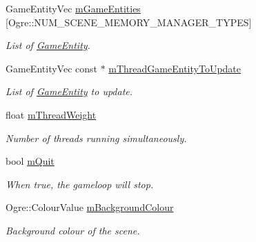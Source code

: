\begin{DoxyCompactItemize}
\mbox{\label{class_common_1_1_graphics_system_a39c347647fabbfb8d86a8e7fc55825bd}} 
Game\+Entity\+Vec \hyperlink{class_common_1_1_graphics_system_a39c347647fabbfb8d86a8e7fc55825bd}{m\+Game\+Entities} \mbox{[}Ogre\+::\+N\+U\+M\+\_\+\+S\+C\+E\+N\+E\+\_\+\+M\+E\+M\+O\+R\+Y\+\_\+\+M\+A\+N\+A\+G\+E\+R\+\_\+\+T\+Y\+P\+ES\mbox{]}
\begin{DoxyCompactList}\small\item\em List of \hyperlink{struct_common_1_1_game_entity}{Game\+Entity}. \end{DoxyCompactList}\item 
\mbox{\label{class_common_1_1_graphics_system_adaf0d898cd16130084bdf36220f6111b}} 
Game\+Entity\+Vec const  $\ast$ \hyperlink{class_common_1_1_graphics_system_adaf0d898cd16130084bdf36220f6111b}{m\+Thread\+Game\+Entity\+To\+Update}
\begin{DoxyCompactList}\small\item\em List of \hyperlink{struct_common_1_1_game_entity}{Game\+Entity} to update. \end{DoxyCompactList}\item 
\mbox{\label{class_common_1_1_graphics_system_a41e916be28a4d889337a4c8c0868b3ed}} 
float \hyperlink{class_common_1_1_graphics_system_a41e916be28a4d889337a4c8c0868b3ed}{m\+Thread\+Weight}
\begin{DoxyCompactList}\small\item\em Number of threads running simultaneously. \end{DoxyCompactList}\item 
\mbox{\label{class_common_1_1_graphics_system_a141239a20891b1a980e319a89420f2b0}} 
bool \hyperlink{class_common_1_1_graphics_system_a141239a20891b1a980e319a89420f2b0}{m\+Quit}
\begin{DoxyCompactList}\small\item\em When true, the gameloop will stop. \end{DoxyCompactList}\item 
\mbox{\label{class_common_1_1_graphics_system_a64e431c0b8b4a8913e488a845afdc48d}} 
Ogre\+::\+Colour\+Value \hyperlink{class_common_1_1_graphics_system_a64e431c0b8b4a8913e488a845afdc48d}{m\+Background\+Colour}
\begin{DoxyCompactList}\small\item\em Background colour of the scene. \end{DoxyCompactList}\end{DoxyCompactItemize}


